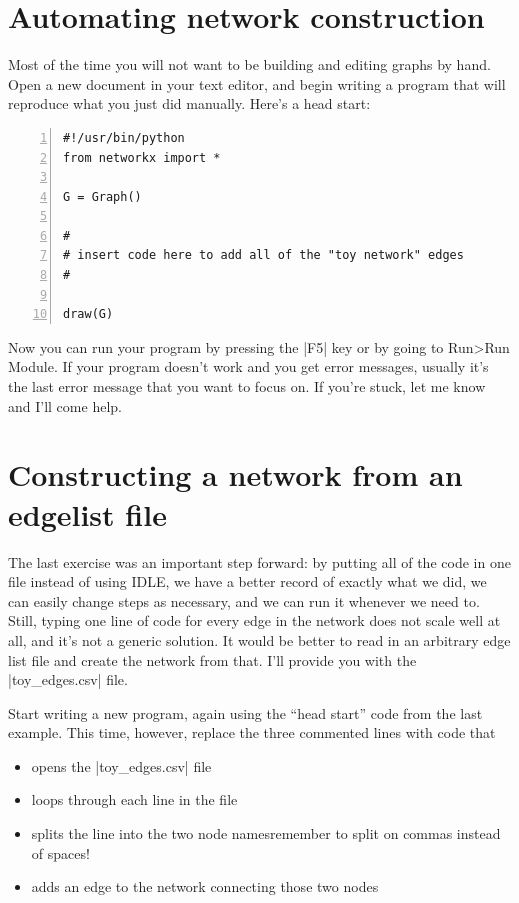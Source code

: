 \documentclass{article}
\begin{document}
\section{Automating network construction}
Most of the time you will not want to be building and editing graphs by hand.  Open a new document in your text editor, and begin writing a program that will reproduce what you just did manually.  Here's a head start:

\begin{Verbatim}[numbers = left, samepage=true]
#!/usr/bin/python
from networkx import *

G = Graph()

#
# insert code here to add all of the "toy network" edges
#

draw(G)
\end{Verbatim}

Now you can run your program by pressing the |F5| key or by going to Run\textgreater Run Module.  If your program doesn't work and you get error
 messages, usually it's the last error message that you want to focus on.  If you're stuck, let me know and I'll come help.

\section{Constructing a network from an edgelist file}
\label{edges_to_net}
The last exercise was an important step forward: by putting all of the code in one file instead of using IDLE, we have a better record of exactly what
we did, we can easily change steps as necessary, and we can run it whenever we need to.  Still, typing one line of code for every edge in the network
does not scale well at all, and it's not a generic solution.  It would be better to read in an arbitrary edge list file and create the network from that.
I'll provide you with the |toy_edges.csv| file.

Start writing a new program, again using the ``head start'' code from the last example.  This time, however, replace the three commented lines with 
code that

\begin{itemize}
\item opens the |toy_edges.csv| file
\item loops through each line in the file
\item splits the line into the two node names\textemdash remember to split on commas instead of spaces!
\item adds an edge to the network connecting those two nodes
\end{itemize}
\end{document}
